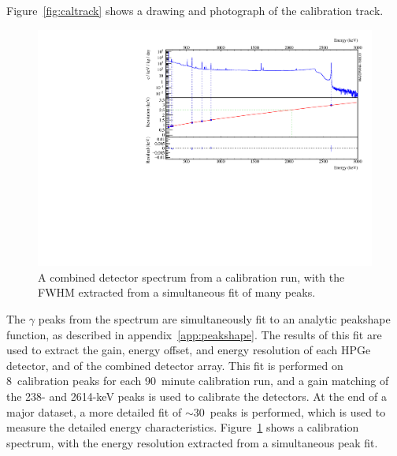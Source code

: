 \documentclass[/main.tex]{subfiles}
\begin{document}
Figure~\ref{fig:caltrack} shows a drawing and photograph of the calibration track.
\\
\begin{figure}
  \centering
  \includegraphics[width=\textwidth]{calfwhm}
  \caption[Calibration spectrum with FWHM]{\label{fig:calfwhm}
    A combined detector spectrum from a  calibration run, with the FWHM extracted from a simultaneous fit of many peaks.
  }
\end{figure}
The $\gamma$ peaks from the  spectrum are simultaneously fit to an analytic peakshape function, as described in appendix~\ref{app:peakshape}.
The results of this fit are used to extract the gain, energy offset, and energy resolution of each HPGe detector, and of the combined detector array.
This fit is performed on 8~calibration peaks for each 90~minute calibration run, and a gain matching of the 238- and 2614-keV peaks is used to calibrate the detectors.
At the end of a major dataset, a more detailed fit of $\sim30$~peaks is performed, which is used to measure the detailed energy characteristics.
Figure~\ref{fig:calfwhm} shows a  calibration spectrum, with the energy resolution extracted from a simultaneous peak fit.
\\
\end{document}
